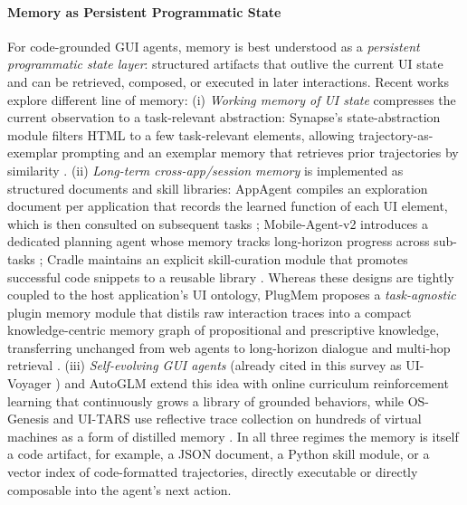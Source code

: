 \documentclass{llmxive}
\begin{document}
\paragraph{Memory as Persistent Programmatic State}
For code-grounded GUI agents, memory is best understood as a \textit{persistent programmatic state layer}: structured artifacts that outlive the current UI state and can be retrieved, composed, or executed in later interactions. Recent works explore different line of memory: (i) \textit{Working memory of UI state} compresses the current observation to a task-relevant abstraction: Synapse's state-abstraction module filters HTML to a few task-relevant elements, allowing trajectory-as-exemplar prompting and an exemplar memory that retrieves prior trajectories by similarity \citep{zheng2024synapsetrajectoryasexemplarpromptingmemory}. (ii) \textit{Long-term cross-app/session memory} is implemented as structured documents and skill libraries: AppAgent compiles an exploration document per application that records the learned function of each UI element, which is then consulted on subsequent tasks \citep{zhang2023appagentmultimodalagentssmartphone}; Mobile-Agent-v2 introduces a dedicated planning agent whose memory tracks long-horizon progress across sub-tasks \citep{wang2024mobileagentv2mobiledeviceoperation}; Cradle maintains an explicit skill-curation module that promotes successful code snippets to a reusable library \citep{tan2024cradleempoweringfoundationagents}. Whereas these designs are tightly coupled to the host application's UI ontology, PlugMem proposes a \textit{task-agnostic} plugin memory module that distils raw interaction traces into a compact knowledge-centric memory graph of propositional and prescriptive knowledge, transferring unchanged from web agents to long-horizon dialogue and multi-hop retrieval \citep{yang2026plugmemtaskagnosticpluginmemory}. (iii) \textit{Self-evolving GUI agents} (already cited in this survey as UI-Voyager \citep{lin2026uivoyagerselfevolvingguiagent}) and AutoGLM extend this idea with online curriculum reinforcement learning that continuously grows a library of grounded behaviors, while OS-Genesis and UI-TARS use reflective trace collection on hundreds of virtual machines as a form of distilled memory \citep{liu2024autoglmautonomousfoundationagents,sun2025osgenesisautomatingguiagent,qin2025uitarspioneeringautomatedgui}. In all three regimes the memory is itself a code artifact, for example, a JSON document, a Python skill module, or a vector index of code-formatted trajectories, directly executable or directly composable into the agent's next action.
\end{document}
